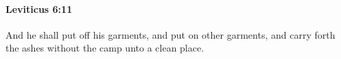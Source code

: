 
		\paragraph{Leviticus 6:11} %
			\label{LEVITICUS-6-11}

			And he shall put off his garments, and put on other garments, and carry forth the ashes without the camp unto a clean place.


